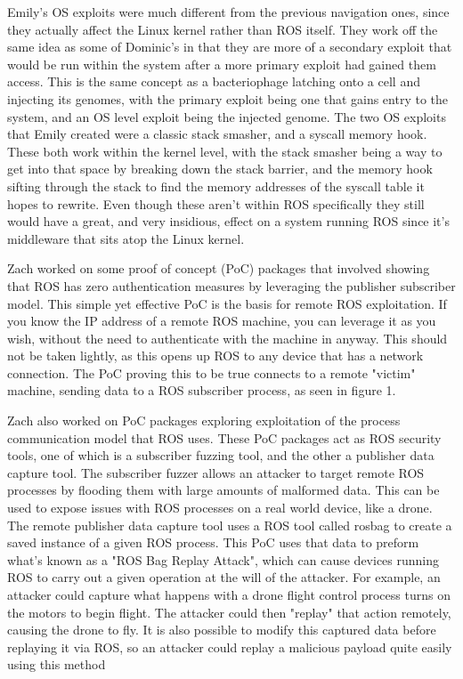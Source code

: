 \documentclass[IEEEtran,letterpaper,10pt,notitlepage,draftclsnofoot,onecolumn]{article}
\begin{document}
Emily's OS exploits were much different from the previous navigation ones, since they actually affect the Linux kernel rather than ROS itself.
They work off the same idea as some of Dominic's in that they are more of a secondary exploit that would be run within the system after a more primary exploit had gained them access.
This is the same concept as a bacteriophage latching onto a cell and injecting its genomes, with the primary exploit being one that gains entry to the system, and an OS level exploit being the injected genome.
The two OS exploits that Emily created were a classic stack smasher, and a syscall memory hook.
These both work within the kernel level, with the stack smasher being a way to get into that space by breaking down the stack barrier, and the memory hook sifting through the stack to find the memory addresses of the syscall table it hopes to rewrite.
Even though these aren't within ROS specifically they still would have a great, and very insidious, effect on a system running ROS since it's middleware that sits atop the Linux kernel.

Zach worked on some proof of concept (PoC) packages that involved showing that ROS has zero authentication measures by leveraging the publisher subscriber model.
This simple yet effective PoC is the basis for remote ROS exploitation. If you know the IP address of a remote ROS machine, you can leverage it as you wish, without the need
to authenticate with the machine in anyway. This should not be taken lightly, as this opens up ROS to any device that has a network connection. The PoC proving this to be true
connects to a remote "victim" machine, sending data to a ROS subscriber process, as seen in figure 1.


Zach also worked on PoC packages exploring exploitation of the process communication model that ROS uses. These PoC packages act as ROS security tools, one of which is a subscriber
fuzzing tool, and the other a publisher data capture tool. The subscriber fuzzer allows an attacker to target remote ROS processes by flooding them with large amounts of malformed data.
This can be used to expose issues with ROS processes on a real world device, like a drone. The remote publisher data capture tool uses a ROS tool called rosbag to create a saved instance
of a given ROS process. This PoC uses that data to preform what's known as a "ROS Bag Replay Attack", which can cause devices running ROS to carry out a given operation at the will of the attacker.
For example, an attacker could capture what happens with a drone flight control process turns on the motors to begin flight. The attacker could then "replay" that action remotely, causing the drone
to fly. It is also possible to modify this captured data before replaying it via ROS, so an attacker could replay a malicious payload quite easily using this method
\end{document}
